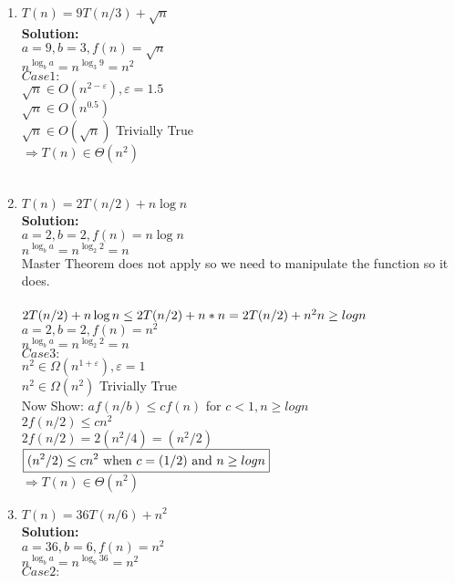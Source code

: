 \documentclass[12pt]{elsart}
\begin{document}
\begin{enumerate}
   \item   $T(n) = 9T(n/3) + \sqrt{n}$\\
	{\bf Solution:}\\
	$a=9, b=3, f(n)=\sqrt{n}$\\
	$n^{\log_b a}=n^{\log_3 9}=n^2$\\
	$Case 1:$\\
	$\sqrt{n} \in O(n^{2-\varepsilon}), \varepsilon =1.5$\\
	$\sqrt{n} \in O(n^{0.5})$\\
	$\sqrt{n} \in O(\sqrt{n})$ Trivially True\\
	$\Rightarrow \boxed{T(n) \in \Theta	(n^2)}$\\\\
	
   \item   $T(n) = 2T(n/2) + n\log n$\\
	{\bf Solution:}\\
	$a=2, b=2, f(n)=n\log n$\\
	$n^{\log_b a}=n^{\log_2 2}=n$\\
	Master Theorem does not apply so we need to manipulate the function so it does.\\\\
	$2T(n/2)+n\log n \leq 2T(n/2)+n*n = 2T(n/2)+n^2 \hfill n\geq logn$\\
	$a=2, b=2, f(n)=n^2$\\
	$n^{\log_b a}=n^{\log_2 2}=n$\\
	$Case 3:$\\
	$n^2 \in \Omega (n^{1+\varepsilon}), \varepsilon = 1$\\
	$n^2 \in \Omega(n^2)$ Trivially True\\
	Now Show: $af(n/b) \leq cf(n)$ for $c<1, n\geq logn$\\
	$2f(n/2)\leq cn^2$\\
	$2f(n/2)=2(n^2/4)=(n^2/2)$\\
	$\boxed{(n^2/2) \leq cn^2$ when $c=(1/2)$ and $n\geq logn}$\\
	$\Rightarrow\boxed{T(n) \in \Theta (n^2)}$\\
   \item   $T(n) = 36T(n/6) + n^2$\\
	{\bf Solution:}\\
	$a=36, b=6, f(n)=n^2$\\
	$n^{\log_b a}=n^{\log_6 36}=n^2$\\
	$Case 2:$\\

\end{enumerate}
\end{document}
